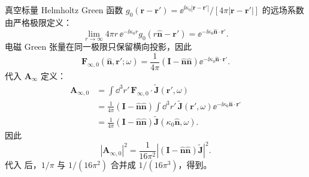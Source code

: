 \begin{derivation}[自由空间电流的光子辐射概率]
真空标量 Helmholtz Green 函数
$g_0(\mathbf r-\mathbf r')=\ee^{\ii\kappa_0|\mathbf r-\mathbf r'|}/[4\pi|\mathbf r-\mathbf r'|]$ 的远场系数由严格极限定义：
\begin{equation*}
\lim_{r\to\infty}
4\pi r\,\ee^{-\ii\kappa_0r}
 g_0(r\hat{\mathbf n}-\mathbf r')
=\ee^{-\ii\kappa_0\hat{\mathbf n}\cdot\mathbf r'}.
\end{equation*}
电磁 Green 张量在同一极限只保留横向投影，因此
\[
\mathbf F_{\infty,0}
(\hat{\mathbf n},\mathbf r';\omega)
=\frac1{4\pi}
(\mathbf I-\hat{\mathbf n}\hat{\mathbf n})
\ee^{-\ii\kappa_0\hat{\mathbf n}\cdot\mathbf r'}.
\]
代入 $\mathbf A_\infty$ 定义：
\begin{align*}
\mathbf A_{\infty,0}
&=\int\dd^3 r'\,
\mathbf F_{\infty,0}\cdot\widetilde{\mathbf J}(\mathbf r',\omega)\\
&=\frac1{4\pi}
(\mathbf I-\hat{\mathbf n}\hat{\mathbf n})
\int\dd^3 r'\,\widetilde{\mathbf J}(\mathbf r',\omega)
\ee^{-\ii\kappa_0\hat{\mathbf n}\cdot\mathbf r'}\\
&=\frac1{4\pi}
(\mathbf I-\hat{\mathbf n}\hat{\mathbf n})
\widetilde{\mathbf J}(\kappa_0\hat{\mathbf n},\omega).
\end{align*}
因此
\[
|\mathbf A_{\infty,0}|^2
=\frac1{16\pi^2}
\left|(\mathbf I-\hat{\mathbf n}\hat{\mathbf n})
\widetilde{\mathbf J}\right|^2.
\]
代入 后，$1/\pi$ 与 $1/(16\pi^2)$ 合并成 $1/(16\pi^3)$，得到。
\end{derivation}

